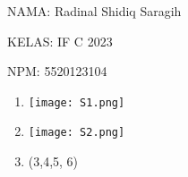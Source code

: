 \documentclass[10pt,a4paper]{article}
\date{}
\newcommand{\lstinputwithcaption}[2]{%
}
\begin{document}
NAMA: Radinal Shidiq Saragih

KELAS: IF C 2023

NPM: 5520123104

\begin{enumerate}

  \item 

    \begin{multicols}{2}

      \begin{center}

        \lstinputwithcaption{./code/src/soal1/Main.java}{Main.java}
        \lstinputwithcaption{./code/src/soal1/Bentuk.java}{Bentuk.java}
        \lstinputwithcaption{./code/src/soal1/BujurSangkar.java}{BujurSangkar.java}
        \lstinputwithcaption{./code/src/soal1/Lingkaran.java}{Lingkaran.java}

        \columnbreak

        \lstinputwithcaption{./code/src/soal1/PersegiPanjang.java}{PersegiPanjang.java}

        \lstinputwithcaption{./code/src/soal1/Segitiga.java}{Segitiga.java}

        
        \texttt{[image: S1.png]}

      \end{center}

    \end{multicols}

    \newpage
  \item 

    \begin{multicols}{2}

      \begin{center}

        \lstinputwithcaption{./code/src/soal2/Suryakancana.java}{Suryakancana.java}
        \columnbreak
        \lstinputwithcaption{./code/src/soal2/Main.java}{Main.java}
        \lstinputwithcaption{./code/src/soal2/Universitas.java}{Universitas.java}
        \texttt{[image: S2.png]}

      \end{center}

    \end{multicols}

  \setcounter{enumi}{5}

  \item (3,4,5, 6) 

    \begin{multicols}{2}


\end{multicols}
\end{enumerate}
\end{document}
